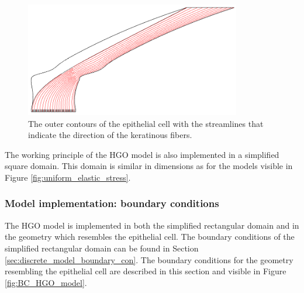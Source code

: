 \begin{figure}[h!]
    \includegraphics[width=0.55\linewidth, height=5cm, angle=0]{images/HGO_model_geometry/geometry_streamlines.PNG}
    \caption{The outer contours of the epithelial cell with the streamlines that indicate the direction of the keratinous fibers.}
    \label{fig:streamlines}
\end{figure}

\qquad The working principle of the HGO model is also implemented in a simplified square domain. This domain is similar in dimensions as for the models visible in Figure \ref{fig:uniform_elastic_stress}. 





\subsubsection{Model implementation: boundary conditions}\label{sec:HGO_boundary_conditions}
The HGO model is implemented in both the simplified rectangular domain and in the geometry which resembles the epithelial cell. The boundary conditions of the simplified rectangular domain can be found in Section \ref{sec:discrete_model_boundary_con}. The boundary conditions for the geometry resembling the epithelial cell are described in this section and visible in Figure \ref{fig:BC_HGO_model}.\\ 



